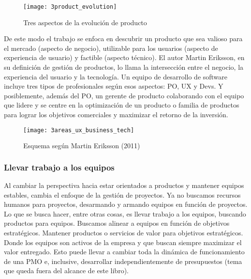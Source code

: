\begin{figure}[h]
  \centering
  \texttt{[image: 3product\_evolution]}
  \caption{Tres aspectos de la evolución de producto}
  \centering
  \label{fig:3product_evolution} %
\end{figure}
\FloatBarrier %

De este modo el trabajo se enfoca en descubrir un producto que sea valioso para el mercado (aspecto de negocio), utilizable para los usuarios (aspecto de experiencia de usuario) y factible (aspecto técnico). El autor Martin Eriksson, en su definición de gestión de productos, lo llama la intersección entre el negocio, la experiencia del usuario y la tecnología. Un equipo de desarrollo de software incluye tres tipos de profesionales según esos aspectos: PO, UX y Devs. Y posiblemente, además del PO, un gerente de producto colaborando con el equipo que lidere y se centre en la optimización de un producto o familia de productos para lograr los objetivos comerciales y maximizar el retorno de la inversión.

\begin{figure}[h]
  \centering
  \texttt{[image: 3areas\_ux\_business\_tech]}
  \caption{Esquema según Martin Eriksson (2011)}
  \centering
  \label{fig:3areas_ux_business_tech} %
\end{figure}
\FloatBarrier %


\subsubsection{Llevar trabajo a los equipos}

Al cambiar la perspectiva hacia estar orientados a productos y mantener equipos estables, cambia el enfoque de la gestión de proyectos. Ya no buscamos recursos humanos para proyectos, desarmando y armando equipos en función de proyectos. Lo que se busca hacer, entre otras cosas, es llevar trabajo a los equipos, buscando productos para equipos. Buscamos alinear a equipos en función de objetivos estratégicos. Mantener productos o servicios de valor para objetivos estratégicos. Donde los equipos son activos de la empresa y que buscan siempre maximizar el valor entregado. Esto puede llevar a cambiar toda la dinámica de funcionamiento de una PMO e, inclusive, desarrollar independientemente de presupuestos (tema que queda fuera del alcance de este libro).


